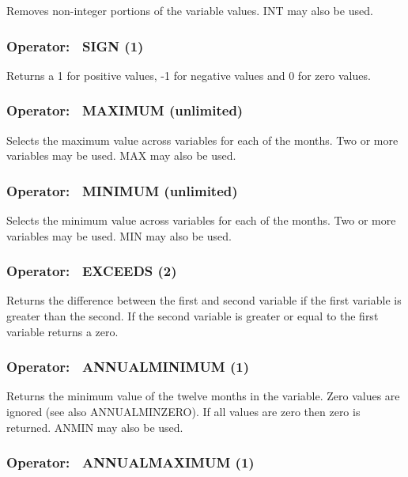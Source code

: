 Removes non-integer portions of the variable values. INT may also be used.

\subsubsection{Operator:~ SIGN (1)}\label{operator-sign-1}

Returns a 1 for positive values, -1 for negative values and 0 for zero values.

\subsubsection{Operator:~ MAXIMUM (unlimited)}\label{operator-maximum-unlimited}

Selects the maximum value across variables for each of the months. Two or more variables may be used. MAX may also be used.

\subsubsection{Operator:~ MINIMUM (unlimited)}\label{operator-minimum-unlimited}

Selects the minimum value across variables for each of the months. Two or more variables may be used. MIN may also be used.

\subsubsection{Operator:~ EXCEEDS (2)}\label{operator-exceeds-2}

Returns the difference between the first and second variable if the first variable is greater than the second. If the second variable is greater or equal to the first variable returns a zero.

\subsubsection{Operator:~ ANNUALMINIMUM (1)}\label{operator-annualminimum-1}

Returns the minimum value of the twelve months in the variable. Zero values are ignored (see also ANNUALMINZERO). If all values are zero then zero is returned. ANMIN may also be used.

\subsubsection{Operator:~ ANNUALMAXIMUM (1)}\label{operator-annualmaximum-1}

